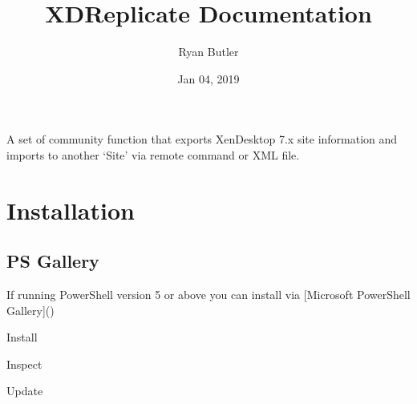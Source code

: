 \documentclass[letterpaper,10pt,english]{sphinxmanual}
\title{XDReplicate Documentation}
\date{Jan 04, 2019}
\author{Ryan Butler}
\begin{document}
\pagestyle{empty}
\sphinxmaketitle
\pagestyle{plain}
\sphinxtableofcontents
\pagestyle{normal}
\label{\detokenize{index::doc}}


A set of community function that exports XenDesktop 7.x site information and imports to another ‘Site’ via remote command or XML file.


\chapter{Installation}
\label{\detokenize{install:installation}}\label{\detokenize{install::doc}}

\section{PS Gallery}
\label{\detokenize{install:ps-gallery}}
If running PowerShell version 5 or above you can install via {[}Microsoft PowerShell Gallery{]}()

Install


Inspect


Update

\end{document}
